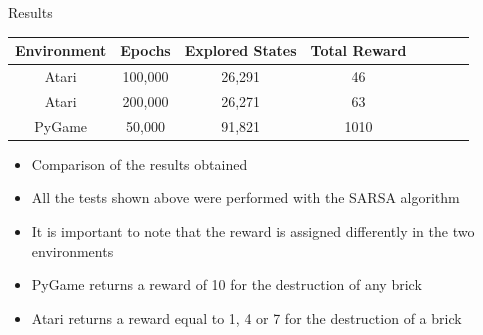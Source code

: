 \begin{frame}{Results}
	\begin{table}[h]
		\centering
		\begin{tabular}{*{8}{c}}
			Environment & Epochs & Explored States & Total Reward \\
			\hline
			Atari & 100,000 & 26,291 & 46 \\
			Atari & 200,000 & 26,271 & 63 \\
			\hline
			PyGame & 50,000 & 91,821 & 1010 \\
		\end{tabular}
	\end{table}
	    \begin{itemize}
		\item Comparison of the results obtained
		\item All the tests shown above were performed with the SARSA algorithm
		\item It is important to note that the reward is assigned differently in the two environments
		\item PyGame returns a reward of 10 for the destruction of any brick
		\item Atari returns a reward equal to 1, 4 or 7 for the destruction of a brick
	    \end{itemize}
\end{frame}

